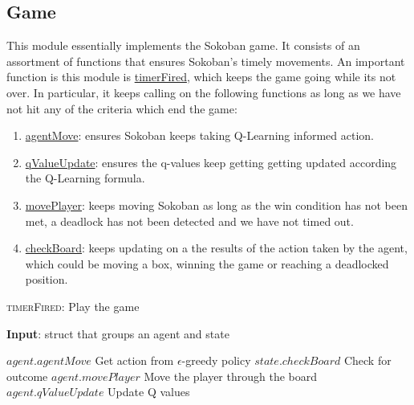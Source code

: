 \documentclass{article}
\begin{document}
\subsection{Game}

This module essentially implements the Sokoban game. It consists of an assortment of functions that ensures Sokoban's timely movements. An important function is this module is \underline{timerFired}, which keeps the game going while its not over. In particular, it keeps calling on the following functions as long as we have not hit any of the criteria which end the game: 


\begin{enumerate}[label=\alph*)]
    \item \underline{agentMove}: ensures Sokoban keeps taking Q-Learning informed action.
    \item \underline{qValueUpdate}: ensures the q-values keep getting getting updated according the Q-Learning formula. 
    \item \underline{movePlayer}: keeps moving Sokoban as long as the win condition has not been met, a deadlock has not been detected and we have not timed out.
    \item \underline{checkBoard}: keeps updating on a the results of the action taken by the agent, which could be moving a box, winning the game or reaching a deadlocked position.
\end{enumerate}

\begin{algorithm}
    \caption{\textsc{timerFired}: Play the game}\label{euclid}
    \hspace*{\algorithmicindent} \textbf{Input}: struct that groups an agent and state \\
    \begin{algorithmic}
        \State $agent.agentMove$ Get action from $\epsilon$-greedy policy
        \State $state.checkBoard$ Check for outcome
        \State $agent.movePlayer$ Move the player through the board
        \State $agent.qValueUpdate$ Update Q values
    \EndIf 
    \end{algorithmic}
\end{algorithm}
\end{document}
